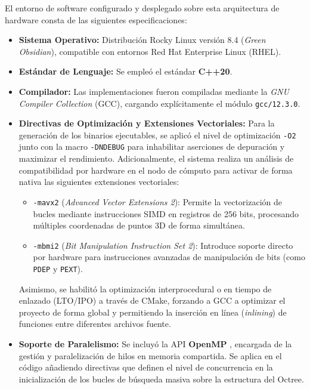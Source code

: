 El entorno de software configurado y desplegado sobre esta arquitectura de hardware consta de las siguientes especificaciones:
\begin{itemize}
    \item \textbf{Sistema Operativo:} Distribución Rocky Linux versión 8.4 (\textit{Green Obsidian}), compatible con entornos Red Hat Enterprise Linux (RHEL).
    \item \textbf{Estándar de Lenguaje:} Se empleó el estándar \textbf{C++20}.
    \item \textbf{Compilador:} Las implementaciones fueron compiladas mediante la \textit{GNU Compiler Collection} (GCC), cargando explícitamente el módulo \texttt{gcc/12.3.0}.
    \item \textbf{Directivas de Optimización y Extensiones Vectoriales:} Para la generación de los binarios ejecutables, se aplicó el nivel de optimización \texttt{-O2} junto con la macro \texttt{-DNDEBUG} para inhabilitar aserciones de depuración y maximizar el rendimiento. Adicionalmente, el sistema realiza un análisis de compatibilidad por hardware en el nodo de cómputo para activar de forma nativa las siguientes extensiones vectoriales:
    \begin{itemize}
        \item \texttt{-mavx2} (\textit{Advanced Vector Extensions 2}): Permite la vectorización de bucles mediante instrucciones SIMD en registros de 256 bits, procesando múltiples coordenadas de puntos 3D de forma simultánea.
        \item \texttt{-mbmi2} (\textit{Bit Manipulation Instruction Set 2}): Introduce soporte directo por hardware para instrucciones avanzadas de manipulación de bits (como \texttt{PDEP} y \texttt{PEXT}).
    \end{itemize}
    Asimismo, se habilitó la optimización interprocedural o en tiempo de enlazado (LTO/IPO) a través de CMake, forzando a GCC a optimizar el proyecto de forma global y permitiendo la inserción en línea (\textit{inlining}) de funciones entre diferentes archivos fuente.
    \item \textbf{Soporte de Paralelismo:} Se incluyó la API \textbf{OpenMP} \cite{openmp}, encargada de la gestión y paralelización de hilos en memoria compartida. Se aplica en el código añadiendo directivas que definen el nivel de concurrencia en la inicialización de los bucles de búsqueda masiva sobre la estructura del Octree.
\end{itemize}



